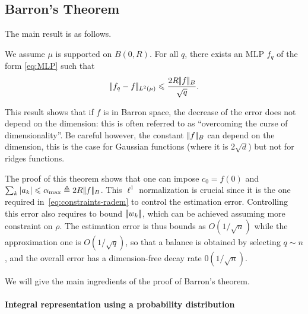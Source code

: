 \subsection{Barron's Theorem}

The main result is as follows.

\begin{thm}
	We assume $\mu$ is supported on $B(0,R)$.
    For all $q$, there exists an MLP $f_q$ of the form \eqref{eq:MLP} such that
    $$
        |\!| f_q - f |\!|_{L^2(\mu)}\leqslant \frac{2R |\!| f |\!|_B}{\sqrt{q}}.
    $$
\end{thm}

This result shows that if $f$ is in Barron space, the decrease of the error does not depend on the dimension: this is often referred to as ``overcoming the curse of dimensionality''. Be careful however, the constant $|\!| f |\!|_B$ can depend on the dimension, this is the case for Gaussian functions (where it is $ 2 \sqrt{d}$) but not for ridges functions.


The proof of this theorem shows that one can impose $c_0 = f(0) $ and $\sum_k | a_k | \leqslant \alpha_{\max} \triangleq 2 R |\!| f |\!|_B$. 
%
This $\ell^1$ normalization is crucial since it is the one required in~\eqref{eq:constraints-radem} to control the estimation error. Controlling this error also requires to bound $|\!| w_k |\!|$, which can be achieved assuming more constraint on $\rho$.
%
The estimation error is thus bounds as $O(1/\sqrt{n})$ while the approximation one is $O(1/\sqrt{q})$, so that a balance is obtained by selecting $q \sim n$, and the overall error has a dimension-free decay rate $0(1/\sqrt{n})$. 

We will give the main ingredients of the proof of Barron's theorem.

\paragraph{Integral representation using a probability distribution}

